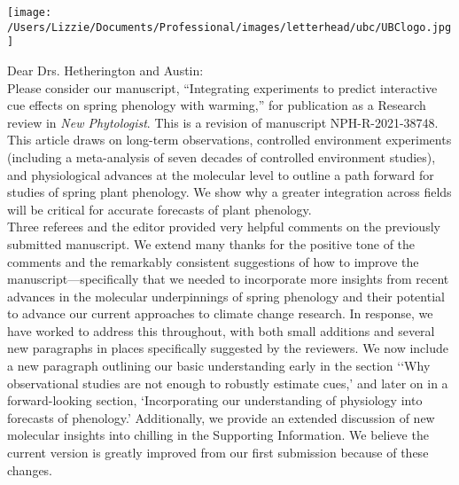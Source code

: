 \documentclass[11pt,a4paper]{letter}
\begin{document}
    \begin{flushright}
\texttt{[image: /Users/Lizzie/Documents/Professional/images/letterhead/ubc/UBClogo.jpg]}
    \end{flushright}
Dear Drs. Hetherington and Austin:
\vspace{1.5ex}\\
Please consider our manuscript, ``Integrating experiments to predict interactive cue effects on spring phenology with warming,'' for publication as a Research review in \emph{New Phytologist}. This is a revision of manuscript NPH-R-2021-38748.
\vspace{1.5ex}\\
This article draws on long-term observations, controlled environment experiments (including a meta-analysis of seven decades of controlled environment studies), and physiological advances at the molecular level to outline a path forward for studies of spring plant phenology. We show why a greater integration across fields will be critical for accurate forecasts of plant phenology. %
\vspace{-1ex}\\
Three referees and the editor provided very helpful comments on the previously submitted manuscript. We extend many thanks for the positive tone of the comments and the remarkably consistent suggestions of how to improve the manuscript---specifically that we needed to incorporate more insights from recent advances in the molecular underpinnings of spring phenology and their potential to advance our current approaches to climate change research. In response, we have worked to address this throughout, with both small additions and several new paragraphs in places specifically suggested by the reviewers. We now include a new paragraph outlining our basic understanding early in the section `‘Why observational studies are not enough to robustly estimate cues,' and later on in a forward-looking section, `Incorporating our understanding of physiology into forecasts of phenology.' Additionally, we provide an extended discussion of new molecular insights into chilling in the Supporting Information. We believe the current version is greatly improved from our first submission because of these changes.
\end{document}

